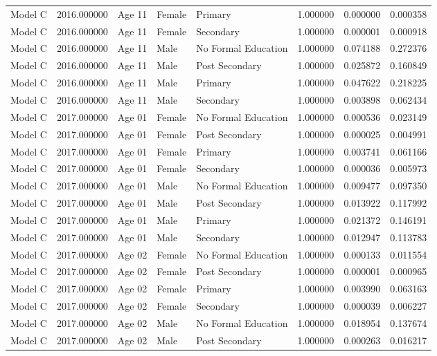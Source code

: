\begin{table}[ht]
\begin{tabular}{lrlllrrr}
Model C & 2016.000000 & Age 11 & Female & Primary & 1.000000 & 0.000000 & 0.000358 \\
Model C & 2016.000000 & Age 11 & Female & Secondary & 1.000000 & 0.000001 & 0.000918 \\
Model C & 2016.000000 & Age 11 & Male & No Formal Education & 1.000000 & 0.074188 & 0.272376 \\
Model C & 2016.000000 & Age 11 & Male & Post Secondary & 1.000000 & 0.025872 & 0.160849 \\
Model C & 2016.000000 & Age 11 & Male & Primary & 1.000000 & 0.047622 & 0.218225 \\
Model C & 2016.000000 & Age 11 & Male & Secondary & 1.000000 & 0.003898 & 0.062434 \\
Model C & 2017.000000 & Age 01 & Female & No Formal Education & 1.000000 & 0.000536 & 0.023149 \\
Model C & 2017.000000 & Age 01 & Female & Post Secondary & 1.000000 & 0.000025 & 0.004991 \\
Model C & 2017.000000 & Age 01 & Female & Primary & 1.000000 & 0.003741 & 0.061166 \\
Model C & 2017.000000 & Age 01 & Female & Secondary & 1.000000 & 0.000036 & 0.005973 \\
Model C & 2017.000000 & Age 01 & Male & No Formal Education & 1.000000 & 0.009477 & 0.097350 \\
Model C & 2017.000000 & Age 01 & Male & Post Secondary & 1.000000 & 0.013922 & 0.117992 \\
Model C & 2017.000000 & Age 01 & Male & Primary & 1.000000 & 0.021372 & 0.146191 \\
Model C & 2017.000000 & Age 01 & Male & Secondary & 1.000000 & 0.012947 & 0.113783 \\
Model C & 2017.000000 & Age 02 & Female & No Formal Education & 1.000000 & 0.000133 & 0.011554 \\
Model C & 2017.000000 & Age 02 & Female & Post Secondary & 1.000000 & 0.000001 & 0.000965 \\
Model C & 2017.000000 & Age 02 & Female & Primary & 1.000000 & 0.003990 & 0.063163 \\
Model C & 2017.000000 & Age 02 & Female & Secondary & 1.000000 & 0.000039 & 0.006227 \\
Model C & 2017.000000 & Age 02 & Male & No Formal Education & 1.000000 & 0.018954 & 0.137674 \\
Model C & 2017.000000 & Age 02 & Male & Post Secondary & 1.000000 & 0.000263 & 0.016217 \\

\end{tabular}
\end{table}

